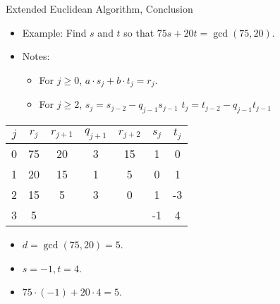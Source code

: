 \documentclass[handout]{beamer}
\begin{document}
\begin{frame}{Extended Euclidean Algorithm, Conclusion}

\begin{itemize}
  \item Example: Find $s$ and $t$ so that $75s+20t = \gcd(75, 20)$.
  \item Notes:
  \begin{itemize}
    \item For $j\geq0$, $a \cdot s_j + b \cdot t_j = r_j$.
    \item For $j\geq 2$, $s_j=s_{j-2} - q_{j-1}s_{j-1}$ \quad $t_j=t_{j-2} - q_{j-1}t_{j-1}$
  \end{itemize}
\end{itemize}

\vspace{1em}

\begin{tabular}{|c|c|c|c|c|c|c|}\hline
$j$   &  $r_{j}$    & $r_{j+1}$ & $q_{j+1}$ & $r_{j+2}$ & $s_j$ & $t_j$ \\ \hline\hline
0     &  75         &  20       &    3      &   15      &  1    &   0   \\ \hline
1     &  20         &  15       &    1      &    5      &  0    &   1   \\ \hline
2     &  15         &   5       &    3      &    0      &  1    &  -3   \\ \hline
3     &   5         &           &           &           & -1    &   4   \\ \hline
\end{tabular}

\begin{itemize}
  \item $d = \gcd(75, 20) = 5$.
  \item $s=-1, t=4$.
  \item $75\cdot(-1) + 20 \cdot 4 = 5$.
\end{itemize}

\end{frame}
\end{document}
